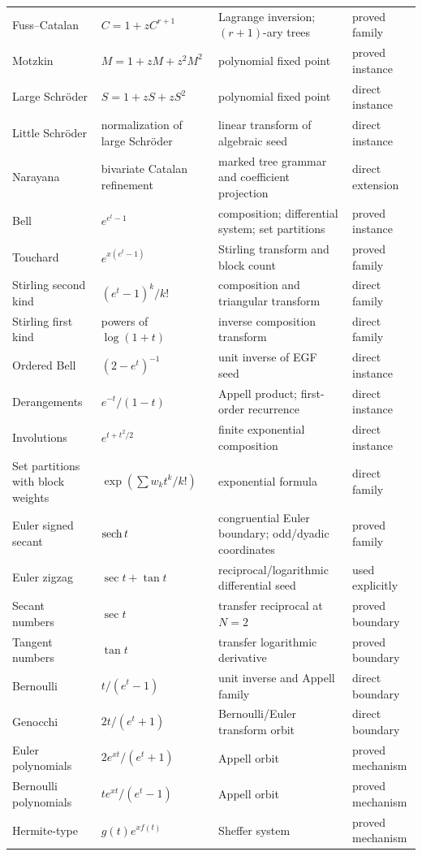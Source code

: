 \documentclass[11pt]{article}
\theoremstyle{definition}\newtheorem{definition}[theorem]{Definition}\newtheorem{example}[theorem]{Example}\newtheorem{construction}[theorem]{Construction}\newtheorem{algorithm}[theorem]{Algorithm}\newtheorem{conjecture}[theorem]{Conjecture}\newtheorem{problem}[theorem]{Problem}
\theoremstyle{remark}\newtheorem{remark}[theorem]{Remark}\newtheorem{boundary}[theorem]{Boundary}\newtheorem{certificate}[theorem]{Computational Certificate}\newtheorem{classical}[theorem]{Classical Input}\newtheorem{principle}[theorem]{Structural Principle}
\begin{document}
\begin{longtable}{L{.15\textwidth}L{.20\textwidth}L{.28\textwidth}L{.18\textwidth}}
Fuss--Catalan&$C=1+zC^{r+1}$&Lagrange inversion; $(r+1)$-ary trees&proved family\\
Motzkin&$M=1+zM+z^2M^2$&polynomial fixed point&proved instance\\
Large Schr\"oder&$S=1+zS+zS^2$&polynomial fixed point&direct instance\\
Little Schr\"oder&normalization of large Schr\"oder&linear transform of algebraic seed&direct instance\\
Narayana&bivariate Catalan refinement&marked tree grammar and coefficient projection&direct extension\\
Bell&$e^{e^t-1}$&composition; differential system; set partitions&proved instance\\
Touchard&$e^{x(e^t-1)}$&Stirling transform and block count&proved family\\
Stirling second kind&$(e^t-1)^k/k!$&composition and triangular transform&direct family\\
Stirling first kind&powers of $\log(1+t)$&inverse composition transform&direct family\\
Ordered Bell&$(2-e^t)^{-1}$&unit inverse of EGF seed&direct instance\\
Derangements&$e^{-t}/(1-t)$&Appell product; first-order recurrence&direct instance\\
Involutions&$e^{t+t^2/2}$&finite exponential composition&direct instance\\
Set partitions with block weights&$\exp(\sum w_kt^k/k!)$&exponential formula&direct family\\
Euler signed secant&$\operatorname{sech} t$&congruential Euler boundary; odd/dyadic coordinates&proved family\\
Euler zigzag&$\sec t+\tan t$&reciprocal/logarithmic differential seed&used explicitly\\
Secant numbers&$\sec t$&transfer reciprocal at $N=2$&proved boundary\\
Tangent numbers&$\tan t$&transfer logarithmic derivative&proved boundary\\
Bernoulli&$t/(e^t-1)$&unit inverse and Appell family&direct boundary\\
Genocchi&$2t/(e^t+1)$&Bernoulli/Euler transform orbit&direct boundary\\
Euler polynomials&$2e^{xt}/(e^t+1)$&Appell orbit&proved mechanism\\
Bernoulli polynomials&$te^{xt}/(e^t-1)$&Appell orbit&proved mechanism\\
Hermite-type&$g(t)e^{x f(t)}$&Sheffer system&proved mechanism\\

\end{longtable}
\end{document}
